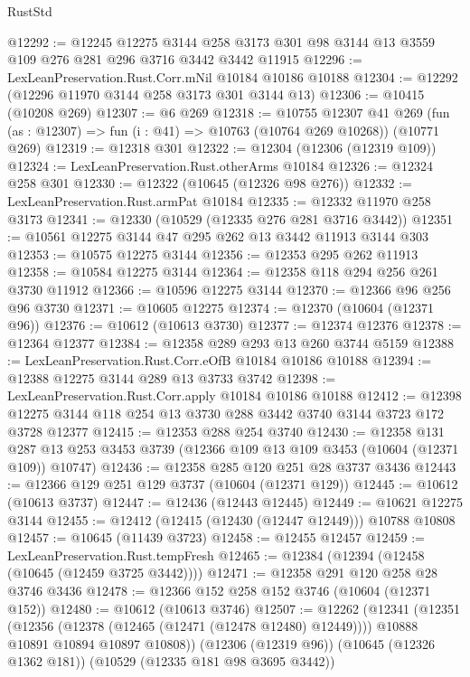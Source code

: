 \begin{lexlean}{RustStd}
\begin{coremodule}
@12292 := @12245
    @12275
    @3144
    @258
    @3173
    @301
    @98
    @3144
    @13
    @3559
    @109
    @276
    @281
    @296
    @3716
    @3442
    @3442
    @11915
@12296 := LexLeanPreservation.Rust.Corr.mNil @10184 @10186 @10188
@12304 := @12292 (@12296 @11970 @3144 @258 @3173 @301 @3144 @13)
@12306 := @10415 (@10208 @269)
@12307 := @6 @269
@12318 := @10755
    @12307
    @41
    @269
    (fun (as : @12307) => fun (i : @41) => @10763 (@10764 @269 @10268))
    (@10771 @269)
@12319 := @12318 @301
@12322 := @12304 (@12306 (@12319 @109))
@12324 := LexLeanPreservation.Rust.otherArms @10184
@12326 := @12324 @258 @301
@12330 := @12322 (@10645 (@12326 @98 @276))
@12332 := LexLeanPreservation.Rust.armPat @10184
@12335 := @12332 @11970 @258 @3173
@12341 := @12330 (@10529 (@12335 @276 @281 @3716 @3442))
@12351 := @10561 @12275 @3144 @47 @295 @262 @13 @3442 @11913 @3144 @303
@12353 := @10575 @12275 @3144
@12356 := @12353 @295 @262 @11913
@12358 := @10584 @12275 @3144
@12364 := @12358 @118 @294 @256 @261 @3730 @11912
@12366 := @10596 @12275 @3144
@12370 := @12366 @96 @256 @96 @3730
@12371 := @10605 @12275
@12374 := @12370 (@10604 (@12371 @96))
@12376 := @10612 (@10613 @3730)
@12377 := @12374 @12376
@12378 := @12364 @12377
@12384 := @12358 @289 @293 @13 @260 @3744 @5159
@12388 := LexLeanPreservation.Rust.Corr.eOfB @10184 @10186 @10188
@12394 := @12388 @12275 @3144 @289 @13 @3733 @3742
@12398 := LexLeanPreservation.Rust.Corr.apply @10184 @10186 @10188
@12412 := @12398 @12275 @3144 @118 @254 @13 @3730 @288 @3442 @3740 @3144 @3723 @172 @3728 @12377
@12415 := @12353 @288 @254 @3740
@12430 := @12358
    @131
    @287
    @13
    @253
    @3453
    @3739
    (@12366 @109 @13 @109 @3453 (@10604 (@12371 @109)) @10747)
@12436 := @12358 @285 @120 @251 @28 @3737 @3436
@12443 := @12366 @129 @251 @129 @3737 (@10604 (@12371 @129))
@12445 := @10612 (@10613 @3737)
@12447 := @12436 (@12443 @12445)
@12449 := @10621 @12275 @3144
@12455 := @12412 (@12415 (@12430 (@12447 @12449))) @10788 @10808
@12457 := @10645 (@11439 @3723)
@12458 := @12455 @12457
@12459 := LexLeanPreservation.Rust.tempFresh
@12465 := @12384 (@12394 (@12458 (@10645 (@12459 @3725 @3442))))
@12471 := @12358 @291 @120 @258 @28 @3746 @3436
@12478 := @12366 @152 @258 @152 @3746 (@10604 (@12371 @152))
@12480 := @10612 (@10613 @3746)
@12507 := @12262
    (@12341
      (@12351
        (@12356 (@12378 (@12465 (@12471 (@12478 @12480) @12449))))
        @10888
        @10891
        @10894
        @10897
        @10808))
    (@12306 (@12319 @96))
    (@10645 (@12326 @1362 @181))
    (@10529 (@12335 @181 @98 @3695 @3442))

\end{coremodule}
\end{lexlean}
